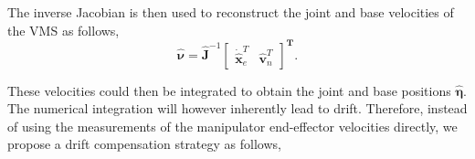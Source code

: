 \documentclass[../main.tex]{subfiles}
\begin{document}
  The inverse Jacobian is then used to reconstruct the joint and base velocities of the VMS as follows,
\begin{equation}
    \label{eq:recons}
    \hat{\bm{\nu}} =  \hat{\bm{J}}^{-1} \begin{bmatrix}
        \dot{\hat{\bm{x}}}_e^T &  \hat{\bm{{v}}}_n^T
    \end{bmatrix}^{\bm{T}}.
\end{equation} \par 
These velocities could then be integrated to obtain the joint and base positions $\hat{\bm{\eta}}$. The numerical integration will however inherently lead to drift.
Therefore, instead of using the measurements of the manipulator end-effector velocities directly, we propose a drift compensation strategy as follows,
\end{document}
